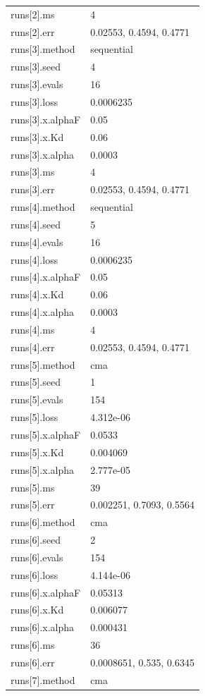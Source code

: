 {\begin{longtable}{p{}p{}}
{}runs[2].ms & 4\\
{}runs[2].err & 0.02553, 0.4594, 0.4771\\
{}runs[3].method & sequential\\
{}runs[3].seed & 4\\
{}runs[3].evals & 16\\
{}runs[3].loss & 0.0006235\\
{}runs[3].x.alphaF & 0.05\\
{}runs[3].x.Kd & 0.06\\
{}runs[3].x.alpha & 0.0003\\
{}runs[3].ms & 4\\
{}runs[3].err & 0.02553, 0.4594, 0.4771\\
{}runs[4].method & sequential\\
{}runs[4].seed & 5\\
{}runs[4].evals & 16\\
{}runs[4].loss & 0.0006235\\
{}runs[4].x.alphaF & 0.05\\
{}runs[4].x.Kd & 0.06\\
{}runs[4].x.alpha & 0.0003\\
{}runs[4].ms & 4\\
{}runs[4].err & 0.02553, 0.4594, 0.4771\\
{}runs[5].method & cma\\
{}runs[5].seed & 1\\
{}runs[5].evals & 154\\
{}runs[5].loss & 4.312e-06\\
{}runs[5].x.alphaF & 0.0533\\
{}runs[5].x.Kd & 0.004069\\
{}runs[5].x.alpha & 2.777e-05\\
{}runs[5].ms & 39\\
{}runs[5].err & 0.002251, 0.7093, 0.5564\\
{}runs[6].method & cma\\
{}runs[6].seed & 2\\
{}runs[6].evals & 154\\
{}runs[6].loss & 4.144e-06\\
{}runs[6].x.alphaF & 0.05313\\
{}runs[6].x.Kd & 0.006077\\
{}runs[6].x.alpha & 0.000431\\
{}runs[6].ms & 36\\
{}runs[6].err & 0.0008651, 0.535, 0.6345\\
{}runs[7].method & cma\\

\end{longtable}}
